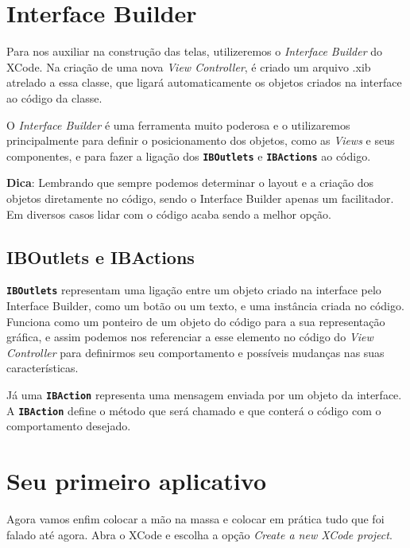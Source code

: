 \documentclass[a4paper,12pt,brazil,oneside]{book}
\begin{document}
\section{Interface Builder}

Para nos auxiliar na construção das telas, utilizeremos o \emph{Interface Builder} do XCode. Na criação de uma nova \emph{View Controller}, é criado um arquivo .xib atrelado a essa classe, que ligará automaticamente os objetos criados na interface ao código da classe.

O \emph{Interface Builder} é uma ferramenta muito poderosa e o utilizaremos principalmente para definir o posicionamento dos objetos, como as \emph{Views} e seus componentes, e para fazer a ligação dos \texttt{\textbf{IBOutlets}} e \texttt{\textbf{IBActions}} ao código.

\begin{framed}

\textbf{Dica}:  Lembrando que sempre podemos determinar o layout e a criação dos objetos diretamente no código, sendo o Interface Builder apenas um facilitador. Em diversos casos lidar com o código acaba sendo a melhor opção.
\end{framed}

\subsection{IBOutlets e IBActions}

\texttt{\textbf{IBOutlets}} representam uma ligação entre um objeto criado na interface pelo Interface Builder, como um botão ou um texto, e uma instância criada no código. Funciona como um ponteiro de um objeto do código para a sua representação gráfica, e assim podemos nos referenciar a esse elemento no código do \emph{View Controller} para definirmos seu comportamento e possíveis mudanças nas suas características.

Já uma \texttt{\textbf{IBAction}} representa uma mensagem enviada por um objeto da interface. A \texttt{\textbf{IBAction}} define o método que será chamado e que conterá o código com o comportamento desejado.

\section{Seu primeiro aplicativo}


Agora vamos enfim colocar a mão na massa e colocar em prática tudo que foi falado até agora. Abra o XCode e escolha a opção \emph{Create a new XCode project}.
\end{document}

